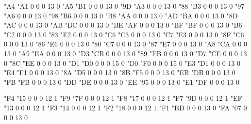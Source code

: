 \setcharcode  "A4  "A1    0    0     0  13  0  
\setcharcode  "A5  "B1    0    0     0  13  0  
\setcharcode  "9D  "A3    0    0     0  13  0  \expandto {\L}
\setcharcode  "88  "B3    0    0     0  13  0  \expandto {\l}
\setcharcode  "97  "A6    0    0     0  13  0  
\setcharcode  "98  "B6    0    0     0  13  0  
\setcharcode  "B8  "AA    0    0     0  13  0  
\setcharcode  "AD  "BA    0    0     0  13  0  
\setcharcode  "8D  "AC    0    0     0  13  0  
\setcharcode  "AB  "BC    0    0     0  13  0  
\setcharcode  "BE  "AF    0    0     0  13  0  
\setcharcode  "BF  "BF    0    0     0  13  0  
\setcharcode  "B6  "C2    0    0     0  13  0  
\setcharcode  "83  "E2    0    0     0  13  0  
\setcharcode  "C6  "C3    0    0     0  13  0  
\setcharcode  "C7  "E3    0    0     0  13  0  
\setcharcode  "8F  "C6    0    0     0  13  0  
\setcharcode  "86  "E6    0    0     0  13  0  
\setcharcode  "80  "C7    0    0     0  13  0  
\setcharcode  "87  "E7    0    0     0  13  0  
\setcharcode  "A8  "CA    0    0     0  13  0  
\setcharcode  "A9  "EA    0    0     0  13  0  
\setcharcode  "D3  "CB    0    0     0  13  0  
\setcharcode  "89  "EB    0    0     0  13  0  
\setcharcode  "D7  "CE    0    0     0  13  0  
\setcharcode  "8C  "EE    0    0     0  13  0  \expandto {\^\i}
\setcharcode  "D1  "D0    0    0     0  15  0  %
\setcharcode  "D0  "F0    0    0     0  15  0  %
\setcharcode  "E3  "D1    0    0     0  13  0  
\setcharcode  "E4  "F1    0    0     0  13  0  
\setcharcode  "8A  "D5    0    0     0  13  0  
\setcharcode  "8B  "F5    0    0     0  13  0  
\setcharcode  "EB  "DB    0    0     0  13  0  
\setcharcode  "FB  "FB    0    0     0  13  0  
\setcharcode  "DD  "DE    0    0     0  13  0  
\setcharcode  "EE  "95    0    0     0  13  0   %
\setcharcode  "E1  "DF    0    0     0  13  0  \expandto {\ss}

\setcharcode  "F4  "15    0    0     0  12  1  %
\setcharcode  "F9  "7F    0    0     0  12  1  %
\setcharcode  "F8  "17    0    0     0  12  1  %
\setcharcode  "F7  "9D    0    0     0  12  1  %
\setcharcode  "EF  "13    0    0     0  12  1  %
\setcharcode  "F3  "14    0    0     0  12  1  %
\setcharcode  "F2  "18    0    0     0  12  1  %
\setcharcode  "F1  "BD    0    0     0  13  0   %
\setcharcode  "FA  "07    0    0     0  13  0    %

